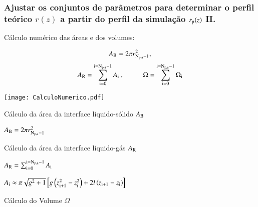 \documentclass[8pt]{beamer}
\begin{document}
\begin{frame}
\frametitle{Ajustar os conjuntos de parâmetros  para determinar o perfil teórico $r(z)$ a partir do perfil da simulação $r_{\rm p}(z)$ II.}
	\vspace{-0.4cm}
	\begin{block}{Cálculo numérico das áreas e dos volumes:}
		\begin{minipage}{0.45\textwidth}
				$$A_{\rm B} = 2\pi r_{\rm N_{\rm p,a} -1}^{\rm 2},$$
				$$A_{\rm R}=\sum_{\rm i=0}^{\rm i = N_{\rm p,a}-1}A_{\rm i}~,~~~~~~~~~~~\Omega=\sum_{\rm i=0}^{\rm i = N_{\rm p,a} -1}\Omega_{\rm i}$$
		\end{minipage}
		\begin{minipage}{0.45\textwidth}
			\begin{flushright}
				\texttt{[image: CalculoNumerico.pdf]}
			\end{flushright}
		\end{minipage}
	\end{block}		
	\vspace{-0.4cm}
	\begin{block}{Cálculo da área da interface líquido-sólido $A_{\rm B}$}
		\begin{center}
				$A_{\rm B} = 2\pi r_{\rm N_{\rm p,a} -1}^{\rm 2}$
		\end{center}
	\end{block}	
	\vspace{-0.4cm}	
	\begin{block}{Cálculo da área da interface líquido-gás $A_{\rm R}$}
		\begin{minipage}{0.3\textwidth}
			\begin{center}
				 $A_{\rm R}=\sum_{\rm i=0}^{\rm i = N_{\rm p,a}-1}A_{\rm i}$
			\end{center}
		\end{minipage}
		\begin{minipage}{0.69\textwidth}
			\begin{center}
				 $A_{\rm i} \approx \pi \sqrt{g^{\rm 2} + 1} \left [  g \left (z_{\rm i+1}^{\rm 2} - z_{\rm i}^{\rm 2} \right ) +2 l\left ( z_{\rm i+1} - z_{\rm i} \right ) \right ]$
			\end{center}
		\end{minipage}
    \end{block}		
    	\vspace{-0.4cm}
		\begin{block}{Cálculo do Volume $\Omega$}
			\begin{minipage}{0.3\textwidth}

\end{minipage}
\end{block}
\end{frame}
\end{document}
